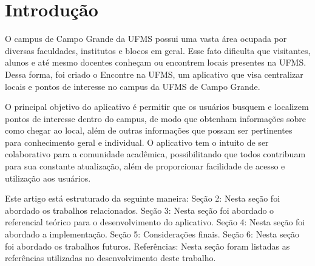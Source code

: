 \section{Introdução}
O campus de Campo Grande da UFMS possui uma vasta área ocupada por diversas faculdades, institutos e blocos em geral. Esse fato dificulta que visitantes, alunos e até mesmo docentes conheçam ou encontrem locais presentes na UFMS. Dessa forma, foi criado o Encontre na UFMS, um aplicativo que visa centralizar locais e pontos de interesse no campus da UFMS de Campo Grande.

O principal objetivo do aplicativo é permitir que os usuários busquem e localizem pontos de interesse dentro do campus, de modo que obtenham informações sobre como chegar ao local, além de outras informações que possam ser pertinentes para conhecimento geral e individual. O aplicativo tem o intuito de ser colaborativo para a comunidade acadêmica, possibilitando que todos contribuam para sua constante atualização, além de proporcionar facilidade de acesso e utilização aos usuários.

Este artigo está estruturado da seguinte maneira: Seção 2: Nesta seção foi abordado os trabalhos relacionados. Seção 3: Nesta seção foi abordado o referencial teórico para o desenvolvimento do aplicativo. Seção 4: Nesta seção foi abordado a implementação. Seção 5: Considerações finais. Seção 6: Nesta seção foi abordado os trabalhos futuros. Referências: Nesta seção foram listadas as referências utilizadas no desenvolvimento deste trabalho.